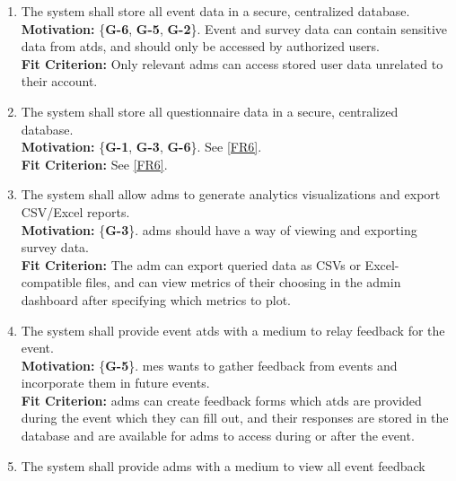 \documentclass[12pt]{article}
\begin{document}
\begin{enumerate}[align=left,
  leftmargin=*,
  labelsep=1em,
  itemindent=0em,
  label=\bfseries FR-\arabic*:,
  ref=\bfseries FR-\arabic*]
    for status updates on payments, waivers, event sign-ins, etc.\\[2mm]
    {\bf Motivation:} \{\textbf{G-4}\}. \Glspl{adm} must have a way to track the event and relay updates as needed.\\
    {\bf Fit Criterion:} The \gls{adm} dashboard provides trackers for sign-ins, and provides a medium to notify
    \glspl{atd} of any changes.
  \item \label{FR6} The system shall store all event data in a secure, centralized database.\\[2mm]
    {\bf Motivation:} \{\textbf{G-6}, \textbf{G-5}, \textbf{G-2}\}. Event and survey data can contain sensitive data
    from \glspl{atd}, and should only be accessed by authorized users.\\
    {\bf Fit Criterion:} Only relevant \glspl{adm} can access stored user data unrelated to their account.
  \item \label{FR7} The system shall store all questionnaire data in a secure, centralized database.\\[2mm]
    {\bf Motivation:} \{\textbf{G-1}, \textbf{G-3}, \textbf{G-6}\}. See \ref{FR6}.\\
    {\bf Fit Criterion:} See \ref{FR6}.
  \item \label{FR8} The system shall allow \glspl{adm} to generate analytics visualizations and export
    CSV/Excel reports.\\[2mm]
    {\bf Motivation:} \{\textbf{G-3}\}. \Glspl{adm} should have a way of viewing and exporting survey data.\\
    {\bf Fit Criterion:} The \gls{adm} can export queried data as CSVs or Excel-compatible files, and can view
    metrics of their choosing in the admin dashboard after specifying which metrics to plot.
  \item \label{FR9} The system shall provide event \glspl{atd} with a medium to relay feedback for the
    event.\\[2mm]
    {\bf Motivation:} \{\textbf{G-5}\}. \Gls{mes} wants to gather feedback from events and incorporate them in future
    events.\\
    {\bf Fit Criterion:} \Glspl{adm} can create feedback forms which \glspl{atd} are provided during the event which
    they can fill out, and their responses are stored in the database and are available for \glspl{adm} to access
    during or after the event.
  \item \label{FR10} The system shall provide \glspl{adm} with a medium to view all event feedback

\end{enumerate}
\end{document}
